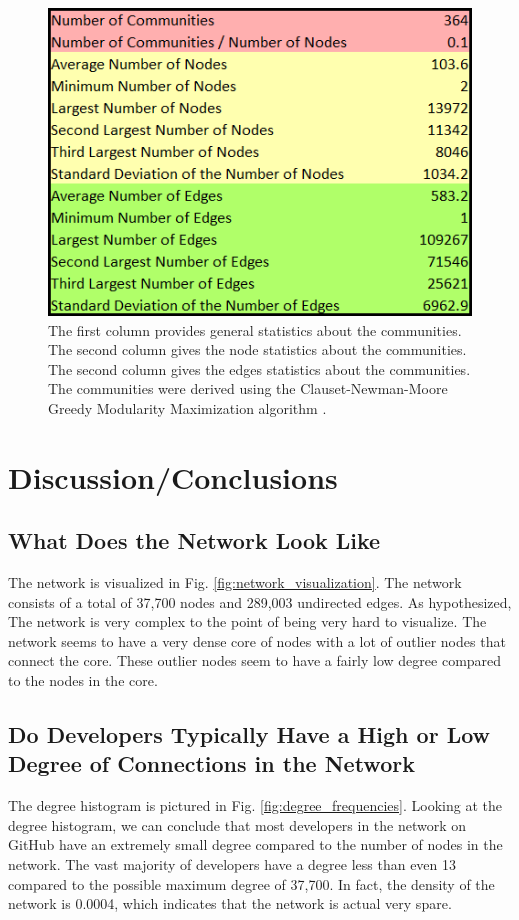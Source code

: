 \documentclass[9pt,twocolumn,twoside]{pnas-new}
\begin{document}
\begin{figure}
\centering
\includegraphics[width=.8\linewidth]{community_table}
\caption{The first column provides general statistics about the communities. The second column gives the node statistics about the communities. The second column gives the edges statistics about the communities. The communities were derived using the Clauset-Newman-Moore Greedy Modularity Maximization algorithm \cite{networkxcommunities}.
}
\label{fig:community_table}
\end{figure}

\section{Discussion/Conclusions}

\subsection{What Does the Network Look Like}

The network is visualized in Fig. \ref{fig:network_visualization}. The network consists of a total of 37,700 nodes and 289,003 undirected edges. As hypothesized, The network is very complex to the point of being very hard to visualize. The network seems to have a very dense core of nodes with a lot of outlier nodes that connect the core. These outlier nodes seem to have a fairly low degree compared to the nodes in the core.

\subsection{Do Developers Typically Have a High or Low Degree of Connections in the Network}

The degree histogram is pictured in Fig. \ref{fig:degree_frequencies}. Looking at the degree histogram, we can conclude that most developers in the network on GitHub have an extremely small degree compared to the number of nodes in the network. The vast majority of developers have a degree less than even 13 compared to the possible maximum degree of 37,700. In fact, the density of the network is 0.0004, which indicates that the network is actual very spare.
\end{document}
